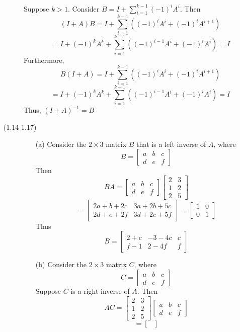 \begin{description}
Suppose $k > 1$. Consider $B = I + \sum_{i=1}^{k-1}(-1)^iA^i$. Then
$$(I+A)B = I + \sum_{i=1}^{k-1}\left((-1)^iA^i + (-1)^iA^{i+1}\right)$$
$$= I + (-1)^kA^k + \sum_{i=1}^{k-1}
\left( (-1)^{i-1}A^i + (-1)^iA^i \right) = I$$
Furthermore,
$$B(I+A) = I + \sum_{i=1}^{k-1}\left((-1)^iA^i + (-1)^iA^{i+1}\right)$$
$$= I + (-1)^kA^k + \sum_{i=1}^{k-1}
\left( (-1)^{i-1}A^i + (-1)^iA^i \right) = I$$
Thus, $(I + A)^{-1} = B$
\item[(1.14 {\color{cBlue}1.17})]
\begin{itemize}
\item[(a)]
Consider the $2 \times 3$ matrix $B$ that is a left inverse of $A$, where
$$B = \begin{bmatrix}
a & b & c \\
d & e & f
\end{bmatrix}$$
Then
$$BA = \begin{bmatrix}
a & b & c \\
d & e & f
\end{bmatrix}\begin{bmatrix}
2 & 3 \\
1 & 2 \\
2 & 5
\end{bmatrix}$$
$$= \begin{bmatrix}
2a + b + 2c & 3a + 2b + 5c \\
2d + e + 2f & 3d + 2e + 5f
\end{bmatrix} = \begin{bmatrix}
1 & 0 \\
0 & 1
\end{bmatrix}$$
Thus
$$B = \begin{bmatrix}
2 + c & -3 - 4c & c \\
f - 1 & 2 - 4f & f
\end{bmatrix}$$
\item[(b)]
Consider the $2 \times 3$ matrix $C$, where
$$C = \begin{bmatrix}
a & b & c \\
d & e & f
\end{bmatrix}$$
Suppose $C$ is a right inverse of $A$. Then
$$AC = \begin{bmatrix}
2 & 3 \\
1 & 2 \\
2 & 5
\end{bmatrix}\begin{bmatrix}
a & b & c \\
d & e & f
\end{bmatrix}$$
$$ = \begin{bmatrix}

\end{bmatrix}$$
\end{itemize}
\end{description}
